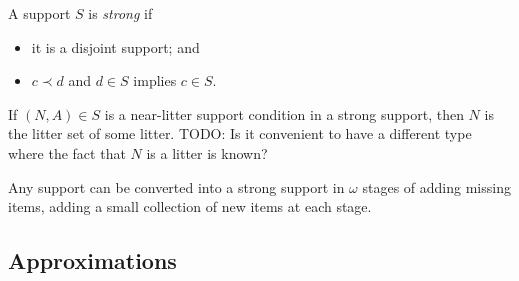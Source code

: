 \documentclass{article}
\begin{document}
\begin{definition}
    A support \( S \) is \emph{strong} if
    \begin{itemize}
        \item it is a disjoint support; and
        \item \( c \prec d \) and \( d \in S \) implies \( c \in S \).
    \end{itemize}
\end{definition}
\begin{lemma}
    If \( (N, A) \in S \) is a near-litter support condition in a strong support, then \( N \) is the litter set of some litter.
    TODO: Is it convenient to have a different type where the fact that \( N \) is a litter is known?
\end{lemma}
\begin{lemma}
    Any support can be converted into a strong support in \( \omega \) stages of adding missing items, adding a small collection of new items at each stage.
\end{lemma}

\subsection{Approximations}
\end{document}
